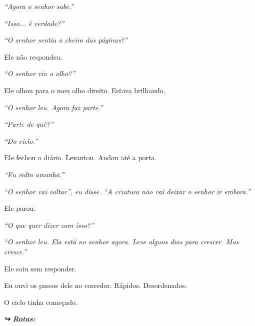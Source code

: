 \noindent \textit{\textquotedblleft{}Agora o senhor sabe.\textquotedblright{}}

\noindent \textit{\textquotedblleft{}Isso... é verdade?\textquotedblright{}}

\noindent \textit{\textquotedblleft{}O senhor sentiu o cheiro das páginas?\textquotedblright{}}

\noindent Ele não respondeu.

\noindent \textit{\textquotedblleft{}O senhor viu o olho?\textquotedblright{}}

\noindent Ele olhou para o meu olho direito. Estava brilhando.

\noindent \textit{\textquotedblleft{}O senhor leu. Agora faz parte.\textquotedblright{}}

\noindent \textit{\textquotedblleft{}Parte de quê?\textquotedblright{}}

\noindent \textit{\textquotedblleft{}Do ciclo.\textquotedblright{}}

\noindent Ele fechou o diário. Levantou. Andou até a porta.

\noindent \textit{\textquotedblleft{}Eu volto amanhã.\textquotedblright{}}

\noindent \textit{\textquotedblleft{}O senhor vai voltar\textquotedblright{}\textit{, eu disse. }\textquotedblleft{}A criatura não vai deixar o senhor ir embora.\textquotedblright{}}

\noindent Ele parou.

\noindent \textit{\textquotedblleft{}O que quer dizer com isso?\textquotedblright{}}

\noindent \textit{\textquotedblleft{}O senhor leu. Ela está no senhor agora. Leve alguns dias para crescer. Mas cresce.\textquotedblright{}}

\noindent Ele saiu sem responder.

\noindent Eu ouvi os passos dele no corredor. Rápidos. Desordenados.

\noindent O ciclo tinha começado.

\vspace{0.5em}
\noindent\textit{\textbf{↪ Rotas:}  \rotasep {} \rotasep {}}
